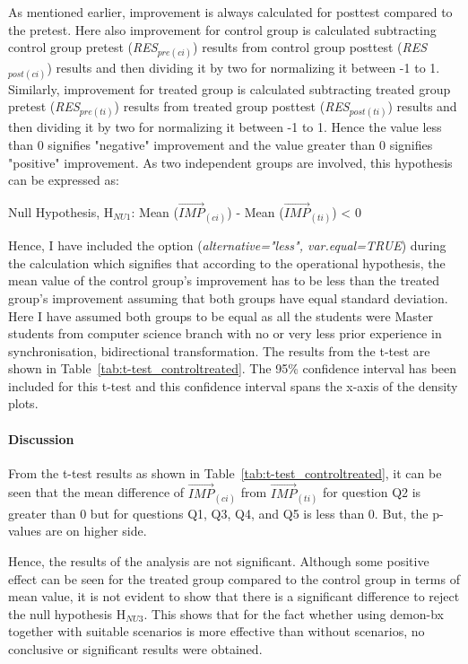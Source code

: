 As mentioned earlier, improvement is always calculated for posttest compared to the pretest. Here also improvement for control group is calculated subtracting control group pretest (\textit{RES$_{pre(ci)}$}) results from control group posttest (\textit{RES$_{post(ci)}$}) results and then dividing it by two for normalizing it between -1 to 1. Similarly, improvement for treated group is calculated subtracting treated group pretest (\textit{RES$_{pre(ti)}$}) results from treated group posttest (\textit{RES$_{post(ti)}$}) results and then dividing it by two for normalizing it between -1 to 1. Hence the value less than 0 signifies "negative" improvement and the value greater than 0 signifies "positive" improvement. As two independent groups are involved, this hypothesis can be expressed as:   

Null Hypothesis, {H$_{NU1}$}: Mean ($\overrightarrow{\textit{IMP}}$\textit{$_{(ci)}$})  - Mean ($\overrightarrow{\textit{IMP}}$\textit{$_{(ti)}$}) < 0

Hence, I have included the option (\textit{alternative="less", var.equal=TRUE}) during the calculation which signifies that according to the operational hypothesis, the mean value of the control group's improvement has to be less than the treated group's improvement assuming that both groups have equal standard deviation. Here I have assumed both groups to be equal as all the students were Master students from computer science branch with no or very less prior experience in synchronisation, bidirectional transformation. The results from the t-test are shown in Table~\ref{tab:t-test_controltreated}. The 95\% confidence interval has been included for this t-test and this confidence interval spans the x-axis of the density plots.

\paragraph{Discussion}
From the t-test results as shown in Table~\ref{tab:t-test_controltreated}, it can be seen that the mean difference of $\overrightarrow{\textit{IMP}}$\textit{$_{(ci)}$} from $\overrightarrow{\textit{IMP}}$\textit{$_{(ti)}$} for question Q2 is greater than 0 but for questions Q1, Q3, Q4, and Q5 is less than 0. But, the p-values are on higher side.

Hence, the results of the analysis are not significant. Although some positive effect can be seen for the treated group compared to the control group in terms of mean value, it is not evident to show that there is a significant difference to reject the null hypothesis {H$_{NU3}$}. This shows that for the fact whether using demon-bx together with suitable scenarios is more effective than without scenarios, no conclusive or significant results were obtained.

